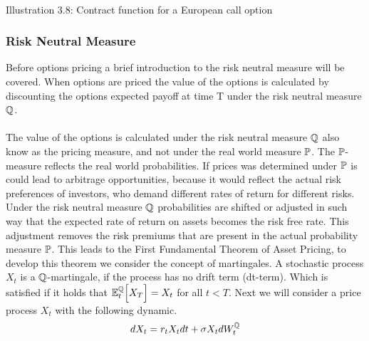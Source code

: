 \begin{center}
    \\[10pt] 
    Illustration 3.8: Contract function for a European call option
\end{center}
\subsubsection{Risk Neutral Measure} \label{risk_neutral_section}
Before options pricing a brief introduction to the risk neutral measure will be covered.
When options are priced the value of the options is calculated by discounting 
the options expected payoff at time T under the risk neutral measure $\mathbb{Q}$. 
\\\\
The value of the options is calculated under the risk neutral measure $\mathbb{Q}$ also know as the pricing measure, and 
not under the real world measure $\mathbb{P}$. The $\mathbb{P}$- measure reflects the real world probabilities. If prices was determined 
under $\mathbb{P}$ is could lead to arbitrage opportunities, because it would reflect the actual risk preferences of
investors, who demand different rates of return for different risks. Under the risk neutral measure $\mathbb{Q}$  
probabilities are shifted or adjusted in such way that the expected rate of return on assets becomes the risk free rate. 
This adjustment removes the risk premiums that are present in the actual probability measure $\mathbb{P}$.
This leads to the First Fundamental Theorem of Asset Pricing, to develop this theorem we consider 
the concept of martingales. 
A stochastic process $X_t$ is a $\mathbb{Q}$-martingale, if the process has no drift term (dt-term). Which is satisfied if it holds that
$\mathbb{E}_{t}^{\mathbb{Q}}\Big[X_T\Big] = X_t$ for all $t<T$. Next we will consider a price process $X_t$ with the following dynamic.
\begin{align}
    d X_t = r_t X_t dt + \sigma X_t d W_{t}^{\mathbb{Q}}
    \label{price_process}
\end{align}
